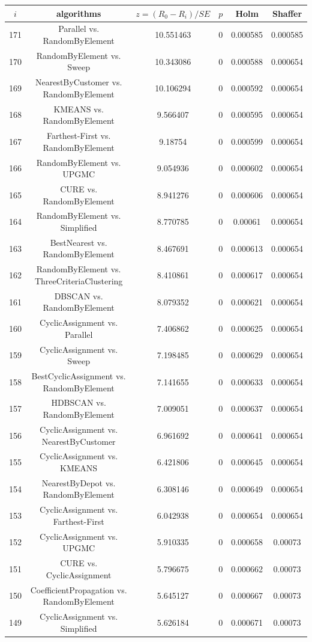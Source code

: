 \documentclass[a4paper,10pt]{article}
\begin{document}
\begin{landscape}
\begin{table}[!htp]
\centering\scriptsize
\begin{tabular}{cccccc}
$i$&algorithms&$z=(R_0 - R_i)/SE$&$p$&Holm&Shaffer\\
\hline171&Parallel vs. RandomByElement&10.551463&0&0.000585&0.000585\\
170&RandomByElement vs. Sweep&10.343086&0&0.000588&0.000654\\
169&NearestByCustomer vs. RandomByElement&10.106294&0&0.000592&0.000654\\
168&KMEANS vs. RandomByElement&9.566407&0&0.000595&0.000654\\
167&Farthest-First vs. RandomByElement&9.18754&0&0.000599&0.000654\\
166&RandomByElement vs. UPGMC&9.054936&0&0.000602&0.000654\\
165&CURE vs. RandomByElement&8.941276&0&0.000606&0.000654\\
164&RandomByElement vs. Simplified&8.770785&0&0.00061&0.000654\\
163&BestNearest vs. RandomByElement&8.467691&0&0.000613&0.000654\\
162&RandomByElement vs. ThreeCriteriaClustering&8.410861&0&0.000617&0.000654\\
161&DBSCAN vs. RandomByElement&8.079352&0&0.000621&0.000654\\
160&CyclicAssignment vs. Parallel&7.406862&0&0.000625&0.000654\\
159&CyclicAssignment vs. Sweep&7.198485&0&0.000629&0.000654\\
158&BestCyclicAssignment vs. RandomByElement&7.141655&0&0.000633&0.000654\\
157&HDBSCAN vs. RandomByElement&7.009051&0&0.000637&0.000654\\
156&CyclicAssignment vs. NearestByCustomer&6.961692&0&0.000641&0.000654\\
155&CyclicAssignment vs. KMEANS&6.421806&0&0.000645&0.000654\\
154&NearestByDepot vs. RandomByElement&6.308146&0&0.000649&0.000654\\
153&CyclicAssignment vs. Farthest-First&6.042938&0&0.000654&0.000654\\
152&CyclicAssignment vs. UPGMC&5.910335&0&0.000658&0.00073\\
151&CURE vs. CyclicAssignment&5.796675&0&0.000662&0.00073\\
150&CoefficientPropagation vs. RandomByElement&5.645127&0&0.000667&0.00073\\
149&CyclicAssignment vs. Simplified&5.626184&0&0.000671&0.00073\\

\end{tabular}
\end{table}
\end{landscape}
\end{document}
